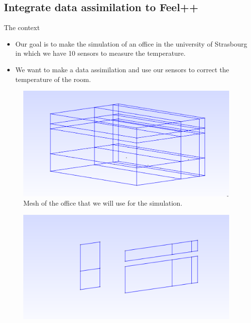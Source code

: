 \subsection{Integrate data assimilation to Feel++}
\begin{frame}[allowframebreaks]{The context}
\begin{itemize}
    \item Our goal is to make the simulation of an office in the university of Strasbourg in which we have 10 sensors to measure the temperature.\\
    \item We want to make a data assimilation and use our sensors to correct the temperature of the room.
\end{itemize}

\begin{minipage}{0.48\linewidth}
    \begin{figure}
        \centering
        \includegraphics[width=\linewidth]{"images/enkf/Maillage_1.jpg"}
        \caption{Mesh of the office that we will use for the simulation.}
    \end{figure}
\end{minipage} \;
\begin{minipage}{0.48\linewidth}
    \begin{figure}
        \centering
        \includegraphics[width=\linewidth]{"images/enkf/Maillage_2.jpg"}

\end{figure}
\end{minipage}
\end{frame}
